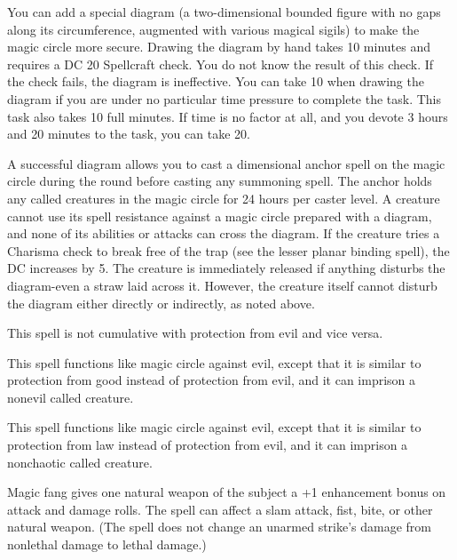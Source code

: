 \begin{multicols}{2}
\begin{small}
\smallskip\noindent You can add a special diagram (a two-dimensional bounded figure with no gaps along its circumference, augmented with various magical sigils) to make the magic circle more secure. Drawing the diagram by hand takes 10 minutes and requires a DC 20 Spellcraft check. You do not know the result of this check. If the check fails, the diagram is ineffective. You can take 10 when drawing the diagram if you are under no particular time pressure to complete the task. This task also takes 10 full minutes. If time is no factor at all, and you devote 3 hours and 20 minutes to the task, you can take 20.

\smallskip\noindent A successful diagram allows you to cast a dimensional anchor spell on the magic circle during the round before casting any summoning spell. The anchor holds any called creatures in the magic circle for 24 hours per caster level. A creature cannot use its spell resistance against a magic circle prepared with a diagram, and none of its abilities or attacks can cross the diagram. If the creature tries a Charisma check to break free of the trap (see the lesser planar binding spell), the DC increases by 5. The creature is immediately released if anything disturbs the diagram-even a straw laid across it. However, the creature itself cannot disturb the diagram either directly or indirectly, as noted above.

\smallskip\noindent This spell is not cumulative with protection from evil and vice versa.


\noindent This spell functions like magic circle against evil, except that it is similar to protection from good instead of protection from evil, and it can imprison a nonevil called creature.

\noindent This spell functions like magic circle against evil, except that it is similar to protection from law instead of protection from evil, and it can imprison a nonchaotic called creature.

\noindent Magic fang gives one natural weapon of the subject a +1 enhancement bonus on attack and damage rolls. The spell can affect a slam attack, fist, bite, or other natural weapon. (The spell does not change an unarmed strike's damage from nonlethal damage to lethal damage.)


\end{small}
\end{multicols}
